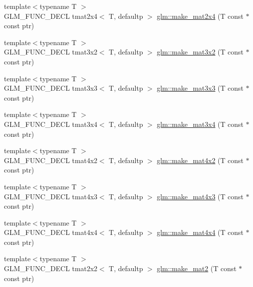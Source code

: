 \begin{DoxyCompactItemize}
\item 
{\footnotesize template$<$typename T $>$ }\\G\+L\+M\+\_\+\+F\+U\+N\+C\+\_\+\+D\+E\+C\+L tmat2x4$<$ T, defaultp $>$ \hyperlink{group__gtc__type__ptr_ga6dfb2ac10859b0cc8e3893ea84fa95b5}{glm\+::make\+\_\+mat2x4} (T const $\ast$const ptr)
\item 
{\footnotesize template$<$typename T $>$ }\\G\+L\+M\+\_\+\+F\+U\+N\+C\+\_\+\+D\+E\+C\+L tmat3x2$<$ T, defaultp $>$ \hyperlink{group__gtc__type__ptr_gabe1e5066608a66da7a94f802b57b4eed}{glm\+::make\+\_\+mat3x2} (T const $\ast$const ptr)
\item 
{\footnotesize template$<$typename T $>$ }\\G\+L\+M\+\_\+\+F\+U\+N\+C\+\_\+\+D\+E\+C\+L tmat3x3$<$ T, defaultp $>$ \hyperlink{group__gtc__type__ptr_ga3cbe7adf857c867cee77eae4617abadd}{glm\+::make\+\_\+mat3x3} (T const $\ast$const ptr)
\item 
{\footnotesize template$<$typename T $>$ }\\G\+L\+M\+\_\+\+F\+U\+N\+C\+\_\+\+D\+E\+C\+L tmat3x4$<$ T, defaultp $>$ \hyperlink{group__gtc__type__ptr_gac083edd180ab4d4b817acc60c516209b}{glm\+::make\+\_\+mat3x4} (T const $\ast$const ptr)
\item 
{\footnotesize template$<$typename T $>$ }\\G\+L\+M\+\_\+\+F\+U\+N\+C\+\_\+\+D\+E\+C\+L tmat4x2$<$ T, defaultp $>$ \hyperlink{group__gtc__type__ptr_ga967a5b934e67ff9a6d1d0d27a377a264}{glm\+::make\+\_\+mat4x2} (T const $\ast$const ptr)
\item 
{\footnotesize template$<$typename T $>$ }\\G\+L\+M\+\_\+\+F\+U\+N\+C\+\_\+\+D\+E\+C\+L tmat4x3$<$ T, defaultp $>$ \hyperlink{group__gtc__type__ptr_ga4d42daced532b33cc672280e48670a51}{glm\+::make\+\_\+mat4x3} (T const $\ast$const ptr)
\item 
{\footnotesize template$<$typename T $>$ }\\G\+L\+M\+\_\+\+F\+U\+N\+C\+\_\+\+D\+E\+C\+L tmat4x4$<$ T, defaultp $>$ \hyperlink{group__gtc__type__ptr_gaf605a5f5e2ff594e8d404b2855b09541}{glm\+::make\+\_\+mat4x4} (T const $\ast$const ptr)
\item 
{\footnotesize template$<$typename T $>$ }\\G\+L\+M\+\_\+\+F\+U\+N\+C\+\_\+\+D\+E\+C\+L tmat2x2$<$ T, defaultp $>$ \hyperlink{group__gtc__type__ptr_ga52a16e333fef7e33ca740779482a8693}{glm\+::make\+\_\+mat2} (T const $\ast$const ptr)
\item 

\end{DoxyCompactItemize}
